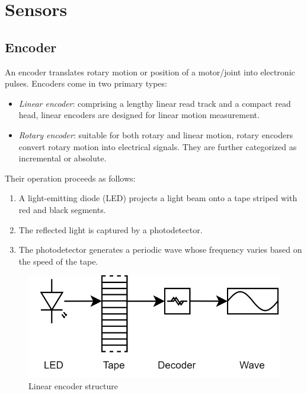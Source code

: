 \section{Sensors}

\subsection{Encoder}
An encoder translates rotary motion or position of a motor/joint into electronic pulses. 
Encoders come in two primary types:
\begin{itemize}
    \item \textit{Linear encoder}: comprising a lengthy linear read track and a compact read head, linear encoders are designed for linear motion measurement.
    \item \textit{Rotary encoder}: suitable for both rotary and linear motion, rotary encoders convert rotary motion into electrical signals. 
        They are further categorized as incremental or absolute.
\end{itemize}
Their operation proceeds as follows:
\begin{enumerate}
    \item A light-emitting diode (LED) projects a light beam onto a tape striped with red and black segments.
    \item The reflected light is captured by a photodetector.
    \item The photodetector generates a periodic wave whose frequency varies based on the speed of the tape.
\end{enumerate}
\begin{figure}[H]
    \centering
    \includegraphics[width=0.6\linewidth]{images/encoder.png}
    \caption{Linear encoder structure}
\end{figure}

